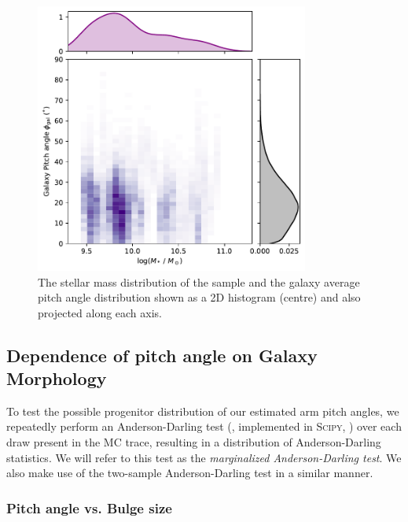 \begin{figure}
  \includegraphics[width=9cm]{plots/stellar_mass_phigal_distribution.pdf}
  \caption{The stellar mass distribution of the sample and the galaxy average pitch angle distribution shown as a 2D histogram (centre) and also projected along each axis. }
  \label{fig:stellar-mass-phigal}
\end{figure}


\subsection{Dependence of pitch angle on Galaxy Morphology}
\label{section:morphology-comparison}

To test the possible progenitor distribution of our estimated arm pitch angles, we repeatedly perform an Anderson-Darling test (\citealt{10.2307/2286009}, implemented in \textsc{Scipy}, \citealt{scipy-paper}) over each draw present in the MC trace, resulting in a distribution of Anderson-Darling statistics. We will refer to this test as the \textit{marginalized Anderson-Darling test}. We also make use of the two-sample Anderson-Darling \citep{doi:10.1080/01621459.1987.10478517} test in a similar manner.

\subsubsection{Pitch angle vs. Bulge size}
\label{section:morphology-comparison-bulge}

